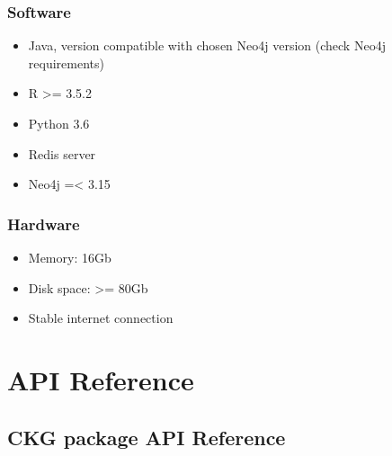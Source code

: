 \documentclass[letterpaper,10pt,english]{sphinxmanual}
\begin{document}
\subsection{Software}
\label{\detokenize{system_requirements:software}}\begin{itemize}
\item {} 
Java, version compatible with chosen Neo4j version (check Neo4j requirements)

\item {} 
R \textgreater{}= 3.5.2

\item {} 
Python 3.6

\item {} 
Redis server

\item {} 
Neo4j =\textless{} 3.15

\end{itemize}


\subsection{Hardware}
\label{\detokenize{system_requirements:hardware}}\begin{itemize}
\item {} 
Memory: 16Gb

\item {} 
Disk space: \textgreater{}= 80Gb

\item {} 
Stable internet connection

\end{itemize}


\chapter{API Reference}
\label{\detokenize{index:api-reference}}

\section{CKG package API Reference}
\label{\detokenize{src:ckg-package-api-reference}}\label{\detokenize{src::doc}}
\end{document}
